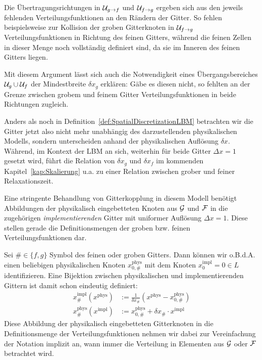 Die Übertragungsrichtungen in \(\mathcal{U}_{g \to f}\) und \(\mathcal{U}_{f \to g}\) ergeben sich aus den jeweils fehlenden Verteilungsfunktionen an den Rändern der Gitter. So fehlen beispielsweise zur Kollision der groben Gitterknoten in \(\mathcal{U}_{f \to g}\) Verteilungsfunktionen in Richtung des feinen Gitters, während die feinen Zellen in dieser Menge noch vollständig definiert sind, da sie im Inneren des feinen Gitters liegen.

Mit diesem Argument lässt sich auch die Notwendigkeit eines Übergangsbereiches \(\mathcal{U}_g \cup \mathcal{U}_f\) der Mindestbreite \(\delta x_g\) erklären: Gäbe es diesen nicht, so fehlten an der Grenze zwischen grobem und feinem Gitter Verteilungsfunktionen in beide Richtungen zugleich.

\bigskip
Anders als noch in Definition~\ref{def:SpatialDiscretizationLBM} betrachten wir die Gitter jetzt also nicht mehr unabhängig des darzustellenden physikalischen Modells, sondern unterscheiden anhand der physikalischen Auflösung \(\delta x\). Während, im Kontext der LBM an sich, weiterhin für beide Gitter \(\Delta x = 1\) gesetzt wird, führt die Relation von \(\delta x_g\) und \(\delta x_f\) im kommenden Kapitel~\ref{kap:Skalierung} u.a. zu einer Relation zwischen grober und feiner Relaxationszeit.

Eine stringente Behandlung von Gitterkopplung in diesem Modell benötigt Abbildungen der physikalisch eingebetteten Knoten aus \(\mathcal{G}\) und \(\mathcal{F}\) in die zugehörigen \emph{implementierenden} Gitter mit uniformer Auflösung \(\Delta x = 1\). Diese stellen gerade die Definitionsmengen der groben bzw. feinen Verteilungsfunktionen dar.

\begin{Definition}
\label{def:BijImplGitter}
Sei \(\# \in \{f, g\}\) Symbol des feinen oder groben Gitters.
Dann können wir o.B.d.A. einen beliebigen physikalischen Knoten \(x_{0,\#}^\text{phys}\) mit dem Knoten \(x_0^\text{impl} = 0 \in L\) identifizieren. Eine Bijektion zwischen physikalischen und implementierenden Gittern ist damit schon eindeutig definiert:
\begin{align*}
x_\#^\text{impl}(x^\text{phys}) &:= \frac{1}{\delta x_\#} (x^\text{phys} - x_{0,\#}^\text{phys}) \\
x_\#^\text{phys}(x^\text{impl}) &:= x_{0,\#}^\text{phys} + \delta x_\# \cdot x^\text{impl}
\end{align*}
Diese Abbildung der physikalisch eingebetteten Gitterknoten in die Definitionsmenge der Verteilungsfunktionen nehmen wir dabei zur Vereinfachung der Notation implizit an, wann immer die Verteilung in Elementen aus \(\mathcal{G}\) oder \(\mathcal{F}\) betrachtet wird.
\end{Definition}

